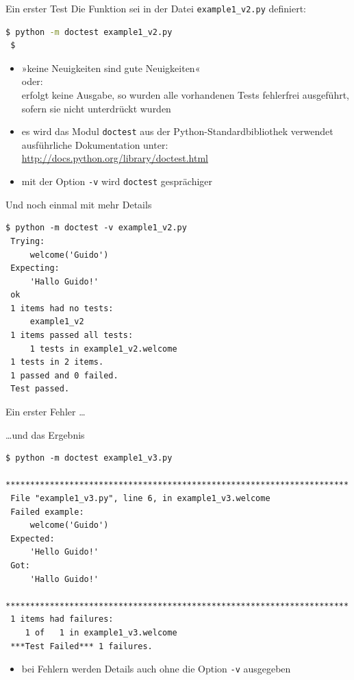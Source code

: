 \documentclass[t, utf8x, 10pt]{beamer}
\begin{document}
\begin{frame}[fragile]{Ein erster Test}
 Die Funktion sei in der Datei \texttt{example1\_v2.py} definiert:

 \begin{lstlisting}[language=bash]
 $ python -m doctest example1_v2.py
 $ 
 \end{lstlisting}

 \begin{itemize}
  \item »keine Neuigkeiten sind gute Neuigkeiten«\\
	oder:\\
	erfolgt keine Ausgabe, so wurden alle vorhandenen Tests fehlerfrei
	ausgeführt, sofern sie nicht unterdrückt wurden
  \item es wird das Modul \texttt{doctest} aus der Python-Standardbibliothek
	verwendet\\
	ausführliche Dokumentation unter:
	\url{http://docs.python.org/library/doctest.html}
  \item mit der Option \texttt{-v} wird \texttt{doctest} gesprächiger
 \end{itemize}
\end{frame}


\begin{frame}[fragile]{Und noch einmal mit mehr Details}
	\begin{lstlisting}[language={}]
 $ python -m doctest -v example1_v2.py
 Trying:
     welcome('Guido')
 Expecting:
     'Hallo Guido!'
 ok
 1 items had no tests:
     example1_v2
 1 items passed all tests:
     1 tests in example1_v2.welcome
 1 tests in 2 items.
 1 passed and 0 failed.
 Test passed.
 \end{lstlisting}
\end{frame}


\begin{frame}{Ein erster Fehler \dots}
 
\end{frame}


\begin{frame}[fragile]{\dots und das Ergebnis}
 \begin{lstlisting}[language={}]
 $ python -m doctest example1_v3.py
 **********************************************************************
 File "example1_v3.py", line 6, in example1_v3.welcome
 Failed example:
     welcome('Guido')
 Expected:
     'Hello Guido!'
 Got:
     'Hallo Guido!'
 **********************************************************************
 1 items had failures:
    1 of   1 in example1_v3.welcome
 ***Test Failed*** 1 failures.
 \end{lstlisting}

 \begin{itemize}
  \item bei Fehlern werden Details auch ohne die Option \texttt{-v} ausgegeben
 \end{itemize}
\end{frame}
\end{document}
